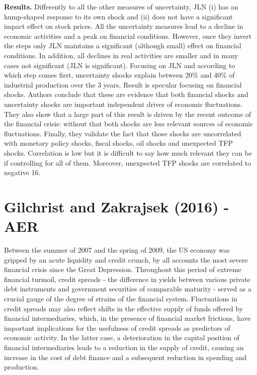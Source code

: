 \documentclass{article}
\begin{document}
{\textbf{Results.} Differently to all the other measures of uncertainty, JLN (i) has an hump-shaped response to its own shock and (ii) does not have a significant impact effect on stock prices. All the uncertainty measures lead to a decline in economic activities and a peak on financial conditions. However, once they invert the steps only JLN maintains a significant (although small) effect on financial conditions. In addition, all declines in real activities are smaller and in many cases not significant (JLN is significant). Focusing on JLN and according to which step comes first, uncertainty shocks explain between 20\% and 40\% of industrial production over the 3 years. Result is specular focusing on financial shocks. Authors conclude that these are evidence that both financial shocks and uncertainty shocks are important independent driver of economic fluctuations. They also show that a large part of this result is driven by the recent outcome of the financial crisis: without that both shocks are less relevant sources of economic fluctuations. Finally, they validate the fact that those shocks are uncorrelated with monetary policy shocks, fiscal shocks, oil shocks and unexpected TFP shocks. Correlation is low but it is difficult to say how much relevant they can be if controlling for all of them. Moreover, unexpected TFP shocks are correlated to negative 16.   



\section*{Gilchrist and Zakrajsek (2016) - AER}

Between the summer of 2007 and the spring of 2009, the US economy was gripped by an acute liquidity and credit crunch, by all accounts the most severe financial crisis since the Great Depression. Throughout this period of extreme financial turmoil, credit spreads - the difference in yields between various private debt instruments and government securities of comparable maturity - served as a crucial gauge of the degree of strains of the financial system. Fluctuations in credit spreads may also reflect shifts in the effective supply of funds offered by financial intermediaries, which, in the presence of financial market frictions, have important implications for the usefulness of credit spreads as predictors of economic activity. In the latter case, a deterioration in the capital position of financial intermediaries leads to a reduction in the supply of credit, causing an increase in the cost of debt finance and a subsequent reduction in spending and production. 

}
\end{document}
